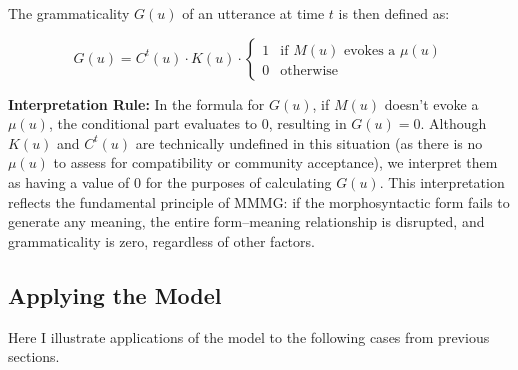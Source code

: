 The grammaticality $G(u)$ of an utterance at time $t$ is then defined as:

\[
G(u) = C^t(u) \cdot K(u) \cdot \begin{cases}
1 & \text{if } M(u) \text{ evokes a } \mu(u) \\
0 & \text{otherwise}
\end{cases}
\]

\noindent \textbf{Interpretation Rule:} In the formula for $G(u)$, if $M(u)$ doesn't evoke a $\mu(u)$, the conditional part evaluates to 0, resulting in $G(u) = 0$. Although $K(u)$ and $C^t(u)$ are technically undefined in this situation (as there is no $\mu(u)$ to assess for compatibility or community acceptance), we interpret them as having a value of 0 for the purposes of calculating $G(u)$. This interpretation reflects the fundamental principle of MMMG: if the morphosyntactic form fails to generate any meaning, the entire form--meaning relationship is disrupted, and grammaticality is zero, regardless of other factors.

\subsection{Applying the Model}

Here I illustrate applications of the model to the following cases from previous sections.

